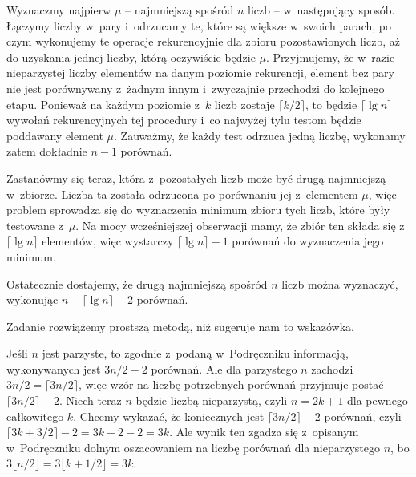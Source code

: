 
\exercise %
Wyznaczmy najpierw $\mu$ -- najmniejszą spośród $n$ liczb -- w~następujący sposób.
Łączymy liczby w~pary i~odrzucamy te, które są większe w~swoich parach, po czym wykonujemy te operacje rekurencyjnie dla zbioru pozostawionych liczb, aż do uzyskania jednej liczby, którą oczywiście będzie $\mu$.
Przyjmujemy, że w~razie nieparzystej liczby elementów na danym poziomie rekurencji, element bez pary nie jest porównywany z~żadnym innym i~zwyczajnie przechodzi do kolejnego etapu.
Ponieważ na każdym poziomie z~$k$ liczb zostaje $\lceil k/2\rceil$, to będzie $\lceil\lg n\rceil$ wywołań rekurencyjnych tej procedury i~co najwyżej tylu testom będzie poddawany element $\mu$.
Zauważmy, że każdy test odrzuca jedną liczbę, wykonamy zatem dokładnie $n-1$ porównań.

Zastanówmy się teraz, która z~pozostałych liczb może być drugą najmniejszą w~zbiorze.
Liczba ta została odrzucona po porównaniu jej z~elementem $\mu$, więc problem sprowadza się do wyznaczenia minimum zbioru tych liczb, które były testowane z~$\mu$.
Na mocy wcześniejszej obserwacji mamy, że zbiór ten składa się z~$\lceil\lg n\rceil$ elementów, więc wystarczy $\lceil\lg n\rceil-1$ porównań do wyznaczenia jego minimum.

Ostatecznie dostajemy, że drugą najmniejszą spośród $n$ liczb można wyznaczyć, wykonując $n+\lceil\lg n\rceil-2$ porównań.

\exercise %
Zadanie rozwiążemy prostszą metodą, niż sugeruje nam to wskazówka.

Jeśli $n$ jest parzyste, to zgodnie z~podaną w~Podręczniku informacją, wykonywanych jest $3n/2-2$ porównań.
Ale dla parzystego $n$ zachodzi $3n/2=\lceil3n/2\rceil$, więc wzór na liczbę potrzebnych porównań przyjmuje postać $\lceil3n/2\rceil-2$.
Niech teraz $n$ będzie liczbą nieparzystą, czyli $n=2k+1$ dla pewnego całkowitego $k$.
Chcemy wykazać, że koniecznych jest $\lceil3n/2\rceil-2$ porównań, czyli $\lceil3k+3/2\rceil-2=3k+2-2=3k$.
Ale wynik ten zgadza się z~opisanym w~Podręczniku dolnym oszacowaniem na liczbę porównań dla nieparzystego $n$, bo $3\lfloor n/2\rfloor=3\lfloor k+1/2\rfloor=3k$.
